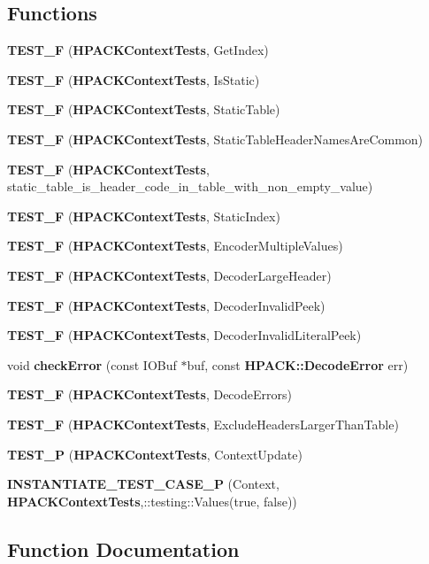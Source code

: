 \subsection*{Functions}
\begin{DoxyCompactItemize}
\item 
{\bf T\+E\+S\+T\+\_\+F} ({\bf H\+P\+A\+C\+K\+Context\+Tests}, Get\+Index)
\item 
{\bf T\+E\+S\+T\+\_\+F} ({\bf H\+P\+A\+C\+K\+Context\+Tests}, Is\+Static)
\item 
{\bf T\+E\+S\+T\+\_\+F} ({\bf H\+P\+A\+C\+K\+Context\+Tests}, Static\+Table)
\item 
{\bf T\+E\+S\+T\+\_\+F} ({\bf H\+P\+A\+C\+K\+Context\+Tests}, Static\+Table\+Header\+Names\+Are\+Common)
\item 
{\bf T\+E\+S\+T\+\_\+F} ({\bf H\+P\+A\+C\+K\+Context\+Tests}, static\+\_\+table\+\_\+is\+\_\+header\+\_\+code\+\_\+in\+\_\+table\+\_\+with\+\_\+non\+\_\+empty\+\_\+value)
\item 
{\bf T\+E\+S\+T\+\_\+F} ({\bf H\+P\+A\+C\+K\+Context\+Tests}, Static\+Index)
\item 
{\bf T\+E\+S\+T\+\_\+F} ({\bf H\+P\+A\+C\+K\+Context\+Tests}, Encoder\+Multiple\+Values)
\item 
{\bf T\+E\+S\+T\+\_\+F} ({\bf H\+P\+A\+C\+K\+Context\+Tests}, Decoder\+Large\+Header)
\item 
{\bf T\+E\+S\+T\+\_\+F} ({\bf H\+P\+A\+C\+K\+Context\+Tests}, Decoder\+Invalid\+Peek)
\item 
{\bf T\+E\+S\+T\+\_\+F} ({\bf H\+P\+A\+C\+K\+Context\+Tests}, Decoder\+Invalid\+Literal\+Peek)
\item 
void {\bf check\+Error} (const I\+O\+Buf $\ast$buf, const {\bf H\+P\+A\+C\+K\+::\+Decode\+Error} err)
\item 
{\bf T\+E\+S\+T\+\_\+F} ({\bf H\+P\+A\+C\+K\+Context\+Tests}, Decode\+Errors)
\item 
{\bf T\+E\+S\+T\+\_\+F} ({\bf H\+P\+A\+C\+K\+Context\+Tests}, Exclude\+Headers\+Larger\+Than\+Table)
\item 
{\bf T\+E\+S\+T\+\_\+P} ({\bf H\+P\+A\+C\+K\+Context\+Tests}, Context\+Update)
\item 
{\bf I\+N\+S\+T\+A\+N\+T\+I\+A\+T\+E\+\_\+\+T\+E\+S\+T\+\_\+\+C\+A\+S\+E\+\_\+P} (Context, {\bf H\+P\+A\+C\+K\+Context\+Tests},\+::testing\+::\+Values(true, false))
\end{DoxyCompactItemize}


\subsection{Function Documentation}
